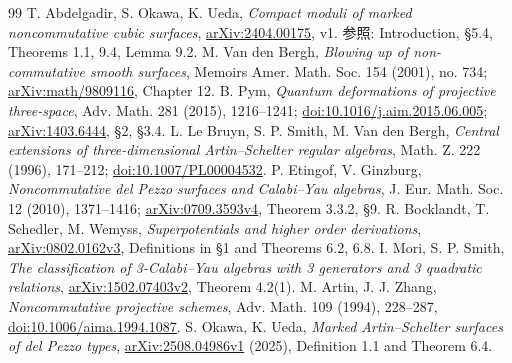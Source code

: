 \documentclass[11pt,a4paper]{ltjsarticle}
\theoremstyle{definition}\newtheorem{remark}[theorem]{注意}
\begin{document}
\begin{thebibliography}{99}
 T. Abdelgadir, S. Okawa, K. Ueda,
\emph{Compact moduli of marked noncommutative cubic surfaces},
\href{https://arxiv.org/abs/2404.00175}{arXiv:2404.00175}, v1.
参照: Introduction, \S5.4, Theorems 1.1, 9.4, Lemma 9.2.
 M. Van den Bergh,
\emph{Blowing up of non-commutative smooth surfaces},
Memoirs Amer. Math. Soc. 154 (2001), no. 734;
\href{https://arxiv.org/abs/math/9809116}{arXiv:math/9809116}, Chapter 12.
 B. Pym, \emph{Quantum deformations of projective three-space},
Adv. Math. 281 (2015), 1216--1241; \href{https://doi.org/10.1016/j.aim.2015.06.005}{doi:10.1016/j.aim.2015.06.005};
\href{https://arxiv.org/abs/1403.6444}{arXiv:1403.6444}, \S2, \S3.4.
 L. Le Bruyn, S. P. Smith, M. Van den Bergh,
\emph{Central extensions of three-dimensional Artin--Schelter regular algebras},
Math. Z. 222 (1996), 171--212; \href{https://doi.org/10.1007/PL00004532}{doi:10.1007/PL00004532}.
 P. Etingof, V. Ginzburg,
\emph{Noncommutative del Pezzo surfaces and Calabi--Yau algebras},
J. Eur. Math. Soc. 12 (2010), 1371--1416;
\href{https://arxiv.org/abs/0709.3593}{arXiv:0709.3593v4}, Theorem 3.3.2, \S9.
 R. Bocklandt, T. Schedler, M. Wemyss,
\emph{Superpotentials and higher order derivations},
\href{https://arxiv.org/abs/0802.0162}{arXiv:0802.0162v3}, Definitions in \S1 and Theorems 6.2, 6.8.
 I. Mori, S. P. Smith,
\emph{The classification of 3-Calabi--Yau algebras with 3 generators and 3 quadratic relations},
\href{https://arxiv.org/abs/1502.07403}{arXiv:1502.07403v2}, Theorem 4.2(1).
 M. Artin, J. J. Zhang,
\emph{Noncommutative projective schemes}, Adv. Math. 109 (1994), 228--287,
\href{https://doi.org/10.1006/aima.1994.1087}{doi:10.1006/aima.1994.1087}.
 S. Okawa, K. Ueda,
\emph{Marked Artin--Schelter surfaces of del Pezzo types},
\href{https://arxiv.org/abs/2508.04986}{arXiv:2508.04986v1} (2025),
Definition 1.1 and Theorem 6.4.
\end{thebibliography}
\end{document}
